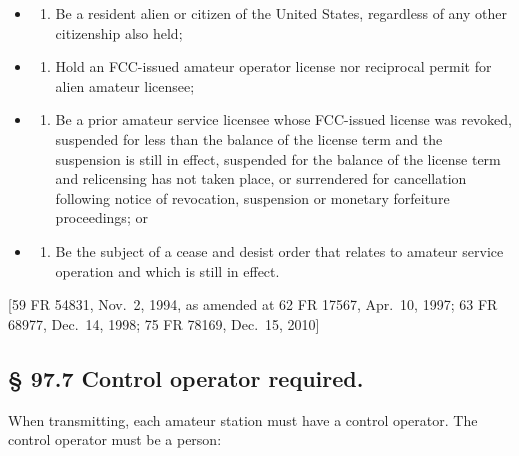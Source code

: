 \documentclass[
  letterpaper,
  DIV=11,
  numbers=noendperiod]{scrreport}
\providecommand{\tightlist}{%
  \setlength{\itemsep}{0pt}\setlength{\parskip}{0pt}}\usepackage{longtable,booktabs,array}
\begin{document}
\begin{itemize}
\item
  \begin{enumerate}
  \def\labelenumi{(\arabic{enumi})}
  \tightlist
  \item
    Be a resident alien or citizen of the United States, regardless of
    any other citizenship also held;
  \end{enumerate}
\item
  \begin{enumerate}
  \def\labelenumi{(\arabic{enumi})}
  \setcounter{enumi}{1}
  \tightlist
  \item
    Hold an FCC-issued amateur operator license nor reciprocal permit
    for alien amateur licensee;
  \end{enumerate}
\item
  \begin{enumerate}
  \def\labelenumi{(\arabic{enumi})}
  \setcounter{enumi}{2}
  \tightlist
  \item
    Be a prior amateur service licensee whose FCC-issued license was
    revoked, suspended for less than the balance of the license term and
    the suspension is still in effect, suspended for the balance of the
    license term and relicensing has not taken place, or surrendered for
    cancellation following notice of revocation, suspension or monetary
    forfeiture proceedings; or
  \end{enumerate}
\item
  \begin{enumerate}
  \def\labelenumi{(\arabic{enumi})}
  \setcounter{enumi}{3}
  \tightlist
  \item
    Be the subject of a cease and desist order that relates to amateur
    service operation and which is still in effect.
  \end{enumerate}
\end{itemize}

{[}59 FR 54831, Nov.~2, 1994, as amended at 62 FR 17567, Apr.~10, 1997;
63 FR 68977, Dec.~14, 1998; 75 FR 78169, Dec.~15, 2010{]}

\hypertarget{97.7}{%
\subsection*{§ 97.7 Control operator required.}\label{97.7}}

When transmitting, each amateur station must have a control operator.
The control operator must be a person:
\end{document}
